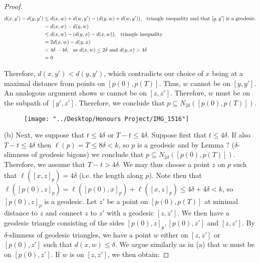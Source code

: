 \documentclass[12pt]{article}
\newcommand{\vs}{\vskip10pt}
\begin{document}
\begin{proof}
		\begin{align*}
		d(x, y') - d(y, y') &\leq d(x,w) + d(w,y') - (d(y, w) + d(w, y')), \hspace{0.25cm} \text{triangle inequality and that } [y,y'] \text{ is a geodesic}. \\
		&= d(x,w) - d(y, w) \\
		&\leq d(x,w) - (d(y,x) - d(x,w)), \hspace{0.25cm} \text{triangle inequality} \\
		&= 2d(x,w) - d(y,x) \\
		&< 4 \delta - 4 \delta, \hspace{0.25cm} \text{as } d(x,w) \leq 2\delta \text{ and } d(y,x) > 4 \delta \\
		&= 0
		\end{align*} 
		
		Therefore, $d(x, y') < d(y,y')$, which contradicts our choice of $x$ being at a maximal distance from points on $[p(0), p(T)]$. Thus, $w$ cannot be on $[y, y']$. An analogous argument shows $w$ cannot be on $[z,z']$. Therefore, $w$ must be on the subpath of $[y', z']$. Therefore, we conclude that $p \subseteq N_{2 \delta}([p(0), p(T)])$. 
		
\begin{figure} [h]
	\centering
	\texttt{[image: "../Desktop/Honours Project/IMG\_1516"]}
	\caption{}
	\label{fig:img1516}
\end{figure}
		
		\vs 
		
		(b) Next, we suppose that $t \leq 4\delta$ or $T - t \leq 4 \delta$. Suppose first that $t \leq 4 \delta$. If also $T - t \leq 4 \delta$ then $\ell(p) = T \leq 8 \delta < k$, so $p$ is a geodesic and by Lemma ? ($\delta$-slimness of geodesic bigons) we conclude that $p \subseteq N_{2 \delta} ([p(0), p(T)])$. Therefore, we assume that $T - t > 4 \delta$. We may thus choose a point $z$ on $p$ such that $\ell([x, z]_p) = 4 \delta$ (i.e. the length along $p$). Note then that $\ell([p(0), z]_p) = \ell([p(0), x]_p) + \ell([x, z]_p) \leq 4 \delta + 4 \delta < k$, so $[p(0), z]_p$ is a geodesic. Let $z'$ be a point on $[p(0), p(T)]$ at minimal distance to $z$ and connect $z$ to $z'$ with a geodesic $[z,z']$. We then have a geodesic triangle consisting of the sides $[p(0), z]_p, [p(0), z']$ and $[z, z']$. By $\delta$-slimness of geodesic triangles, we have a point $w$ either on $[z,z']$ or $[p(0), z']$ such that $d(x, w) \leq \delta$. We argue similarly as in (a) that $w$ must be on $[p(0), z']$. If $w$ is on $[z,z']$, we then obtain: 
		

\end{proof}
\end{document}

